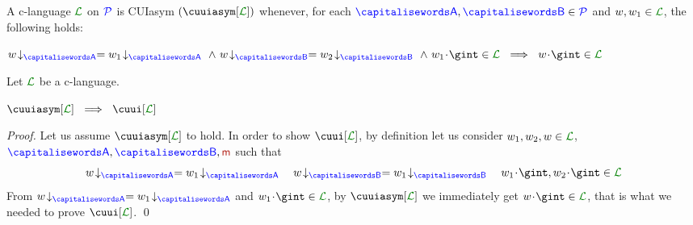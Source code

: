 \begin{definition}[CUIasym]
\label{def:cuiasym}
A c-language $\clang$ on $\mathcal{\color{blue}{P}}$ is CUIasym $(\cuuiasym[\clang])$ whenever,
 for each $\p,\q\in\ptpset$ and $\acword, \acword_1\in\clang$, the following holds:\\
 \centerline{$\proj{\acword}{A} = \proj{\acword_1}{A}\ \land\  \proj{\acword}{B} = \proj{\acword_2}{B}\ \land\  \acword_1\cat\gint\in\clang\ \implies\ \acword\cat\gint\in\clang$}
\end{definition}

\begin{proposition}
Let $\clang$ be a c-language.\\
\centerline{$\cuuiasym[{\clang}]\ \implies\ \cuui[\clang]$}
\end{proposition}
\begin{proof}
Let us assume $\cuuiasym[{\clang}]$ to hold. In order to show  $\cuui[{\clang}]$, 
by definition let us consider $\acword_1,\acword_2,\acword\in\clang$, $\p,\q,\msg$ such that
$$\proj{\acword}{A} =\proj{\acword_1}{A}\quad \proj{\acword}{B} =\proj{\acword_1}{B}
\quad \acword_1\cat\gint, \acword_2\cat\gint\in\clang$$
From $\proj{\acword}{A} =\proj{\acword_1}{A}$ and $\acword_1\cat\gint\in\clang$,
by $\cuuiasym[{\clang}]$ we immediately get  $\acword\cat\gint\in\clang$, that is what we needed to
prove $\cuui[\clang]$.
\qed
\end{proof}


